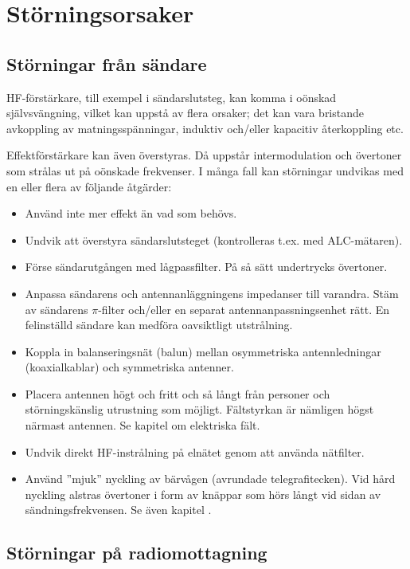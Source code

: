 \section{Störningsorsaker}
\label{Störningsorsaker}
\subsection{Störningar från sändare}

HF-förstärkare, till exempel i sändarslutsteg, kan komma i oönskad självsvängning,
vilket kan uppstå av flera orsaker; det kan vara bristande avkoppling av
matningsspänningar, induktiv och/eller kapacitiv återkoppling etc.

Effektförstärkare kan även överstyras.
Då uppstår intermodulation och övertoner som strålas ut på oönskade frekvenser.
I många fall kan störningar undvikas med en eller flera av följande åtgärder:

\begin{itemize}
\item Använd inte mer effekt än vad som behövs.
\item Undvik att överstyra sändarslutsteget (kontrolleras t.ex. med
  ALC-mätaren).
\item Förse sändarutgången med lågpassfilter.
  På så sätt undertrycks övertoner.
\item Anpassa sändarens och antennanläggningens impedanser till varandra.
  Stäm av sändarens \(\pi\)-filter och/eller en separat antennanpassningsenhet
  rätt.
  En felinställd sändare kan medföra oavsiktligt utstrålning.
\item Koppla in balanseringsnät (balun) mellan osymmetriska antennledningar
  (koaxialkablar) och symmetriska antenner.
\item Placera antennen högt och fritt och så långt från personer och
  störningskänslig utrustning som möjligt.
  Fältstyrkan är nämligen högst närmast antennen.
  Se kapitel  om elektriska fält.
\item Undvik direkt HF-instrålning på elnätet genom att använda nätfilter.
\item Använd ''mjuk'' nyckling av bärvågen (avrundade telegrafitecken).
  Vid hård nyckling alstras övertoner i form av knäppar som hörs långt vid
  sidan av sändningsfrekvensen. Se även kapitel .
\end{itemize}

\subsection{Störningar på radiomottagning}

